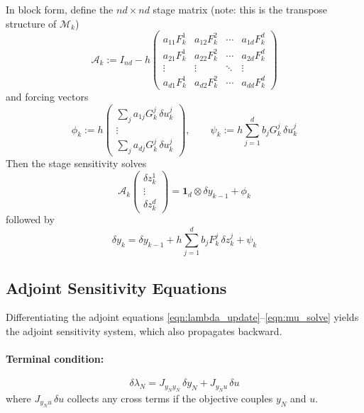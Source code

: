 \documentclass[11pt]{article}
\begin{document}
In block form, define the $nd\times nd$ stage matrix (note: this is the transpose structure of $\mathcal{M}_k$)
\begin{equation}
\mathcal{A}_k := I_{nd} - h \begin{pmatrix}
a_{11} F_k^1 & a_{12} F_k^2 & \cdots & a_{1d} F_k^d \\
a_{21} F_k^1 & a_{22} F_k^2 & \cdots & a_{2d} F_k^d \\
\vdots & \vdots & \ddots & \vdots \\
a_{d1} F_k^1 & a_{d2} F_k^2 & \cdots & a_{dd} F_k^d
\end{pmatrix}
\end{equation}
and forcing vectors
\begin{equation}
\phi_k := h \begin{pmatrix} \sum_j a_{1j} G_k^j \,\delta u_k^j \\ \vdots \\ \sum_j a_{dj} G_k^j\, \delta u_k^j \end{pmatrix}, \qquad
\psi_k := h \sum_{j=1}^d b_j G_k^j \,\delta u_k^j
\end{equation}
Then the stage sensitivity solves
\begin{equation}
\mathcal{A}_k \begin{pmatrix} \delta z_k^1 \\ \vdots \\ \delta z_k^d \end{pmatrix} = \mathbf{1}_d \otimes \delta y_{k-1} + \phi_k
\end{equation}
followed by
\begin{equation}
\delta y_k = \delta y_{k-1} + h\sum_{j=1}^d b_j F_k^j \,\delta z_k^j + \psi_k
\end{equation}

\subsection{Adjoint Sensitivity Equations}

Differentiating the adjoint equations \eqref{eqn:lambda_update}--\eqref{eqn:mu_solve} yields the adjoint sensitivity system, which also propagates backward.

\paragraph{Terminal condition:}
\begin{equation}
\delta\lambda_N = J_{y_N y_N}\, \delta y_N + J_{y_N u}\, \delta u
\end{equation}
where $J_{y_N u}\,\delta u$ collects any cross terms if the objective couples $y_N$ and $u$.
\end{document}
